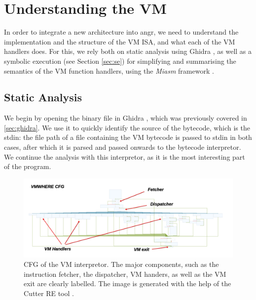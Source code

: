 \section{Understanding the VM}

In order to integrate a new architecture into angr, we need to understand the implementation and the structure of the \gls{VM} \gls{ISA}, and what each of the \gls{VM} handlers does. For this, we rely both on static analysis using Ghidra \cite{ghidra}, as well as a symbolic execution (see Section \ref{sec:se}) for simplifying and summarising the semantics of the \gls{VM} function handlers, using the \emph{Miasm} framework \cite{miasm}.

\subsection{Static Analysis}
\label{static_ghidra}

We begin by opening the binary file in Ghidra \cite{ghidra}, which was previously covered in \ref{sec:ghidra}. We use it to quickly identify the source of the bytecode, which is the \gls{stdin}: the file path of a file containing the \gls{VM} bytecode is passed to \gls{stdin} in both cases, after which it is parsed and passed onwards to the bytecode interpretor. We continue the analysis with this interpretor, as it is the most interesting part of the program.

\begin{figure}[ht]
    \centering
    \includegraphics[width=\textwidth]{./images/cfg_vmwhere}
    \caption{\gls{CFG} of the  \gls{VM} interpretor. The major components, such as the instruction fetcher, the dispatcher, \gls{VM} handers, as well as the \gls{VM} exit are clearly labelled. The image is generated with the help of the Cutter \gls{RE} tool \cite{cutter}.}
    \label{fig:cfg_vmwhere}
\end{figure}

